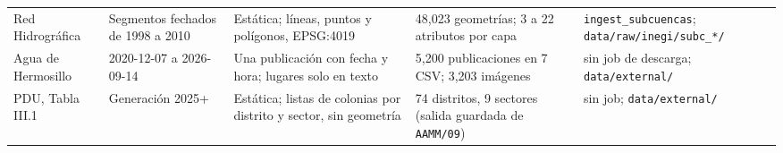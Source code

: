 \documentclass[11pt]{article}
\newcommand{\cod}[1]{\nolinkurl{#1}}
\begin{document}
\begin{table}[!htbp]
\begin{tabularx}{\textwidth}{L{2.2cm} L{2.3cm} Y L{2.4cm} L{3.9cm}}
    Red Hidrográfica & Segmentos fechados de 1998 a 2010 & Estática; líneas, puntos y polígonos, EPSG:4019 & 48,023 geometrías; 3 a 22 atributos por capa & \cod{ingest_subcuencas}; \cod{data/raw/inegi/subc_*/} \\
    Agua de Hermosillo & 2020-12-07 a 2026-09-14 & Una publicación con fecha y hora; lugares solo en texto & 5,200 publicaciones en 7 CSV; 3,203 imágenes & sin job de descarga; \cod{data/external/} \\
    PDU, Tabla III.1 & Generación 2025+ & Estática; listas de colonias por distrito y sector, sin geometría & 74 distritos, 9 sectores (salida guardada de \cod{AAMM/09}) & sin job; \cod{data/external/} \\
    \bottomrule
  \end{tabularx}
\end{table}
\end{document}
